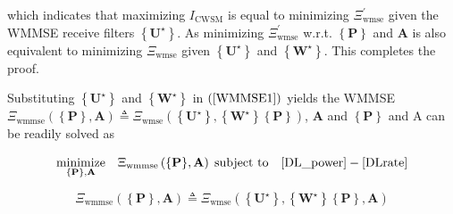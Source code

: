 \documentclass[10pt,journal]{IEEEtran}
\newcommand{\paren}[1]{\left({#1}\right)}
\newcommand{\bracket}[1]{{\left [{#1}\right ]}}
\newcommand{\braces}[1]{{\left\{ {#1}\right\}}}
\newcommand{\rr}{_\mathrm{r}}
\newcommand{\B}{\textrm{B}}
\newcommand{\WBj}{\mathbf{W}_{\mathrm{d},j}\bracket{k}}
\theoremstyle{definition}
\begin{document}
\begin{IEEEproof}

		which indicates that maximizing $\mathit{I}_{\textrm{CWSM}}$ is equal to minimizing $\Xi^\prime_{\textrm{wmse}}$ given the WMMSE receive filters $\braces{\mathbf{U}^\star}$. As minimizing $\Xi^\prime_{\textrm{wmse}}$ w.r.t. $\braces{\mathbf{P}}$ and $\mathbf{A}$ is also equivalent to minimizing $\Xi_{\textrm{wmse}}$ given $\braces{\mathbf{U}^\star}$ and $\braces{\mathbf{W}^\star}$. 
		This completes the proof. %
	\end{IEEEproof}	
	Substituting $\braces{\mathbf{U}^\star}$ and $\braces{\mathbf{W}^\star}$ in $\paren{\ref{WMMSE1}}$ yields the WMMSE  $\Xi_{\textrm{wmmse}}\paren{\braces{\mathbf{P}},\mathbf{A}}\triangleq\Xi_{\textrm{wmse}}\paren{\braces{\mathbf{U}^\star}, \braces{\mathbf{W}^\star} \braces{\mathbf{P}}}$, $\mathbf{A}$ and $\braces{\mathbf{P}}$ and $\mathrm{A}$ can be readily solved as \par\noindent\small
	\begin{equation}
		\label{WMMSE2}
		\underset{{\braces{\mathbf{P}},\mathbf{A}}}{\textrm{minimize}}\quad\Xi_{\textrm{wmmse}}\paren{\braces{\mathbf{P}},\mathbf{A}}\;\textrm{subject to}\quad \eqref{DL_power}-\eqref{DLrate} %
	\end{equation}\normalsize%
	\iffalse
	\par\noindent\small
	\begin{equation}
		\Xi_{\textrm{wmmse}}\paren{\braces{\mathbf{P}},\mathbf{A}}\triangleq\Xi_{\textrm{wmse}}\paren{\braces{\mathbf{U}^\star}, \braces{\mathbf{W}^\star} \braces{\mathbf{P}},\mathbf{A}}
	\end{equation}\normalsize
\end{document}
